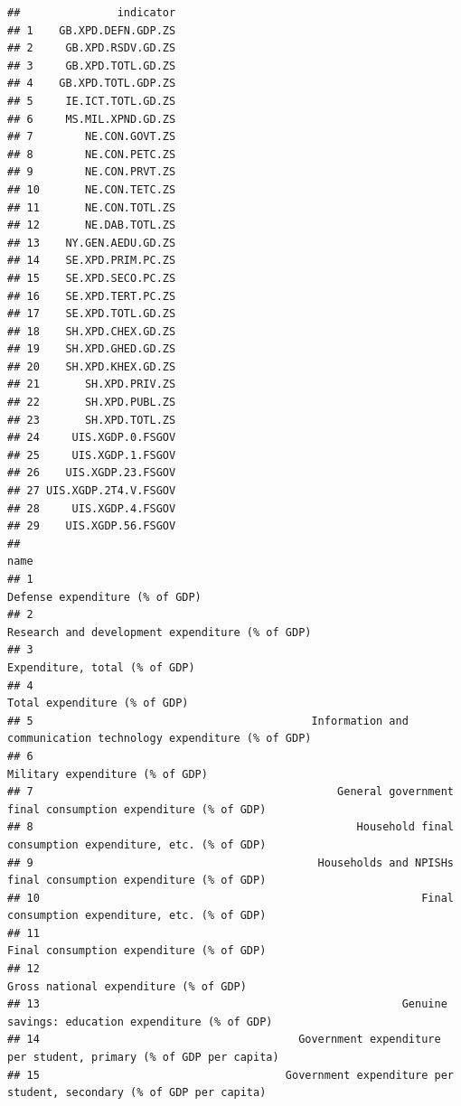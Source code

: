 \documentclass[
]{article}
\begin{document}
\begin{verbatim}
##               indicator
## 1    GB.XPD.DEFN.GDP.ZS
## 2     GB.XPD.RSDV.GD.ZS
## 3     GB.XPD.TOTL.GD.ZS
## 4    GB.XPD.TOTL.GDP.ZS
## 5     IE.ICT.TOTL.GD.ZS
## 6     MS.MIL.XPND.GD.ZS
## 7        NE.CON.GOVT.ZS
## 8        NE.CON.PETC.ZS
## 9        NE.CON.PRVT.ZS
## 10       NE.CON.TETC.ZS
## 11       NE.CON.TOTL.ZS
## 12       NE.DAB.TOTL.ZS
## 13    NY.GEN.AEDU.GD.ZS
## 14    SE.XPD.PRIM.PC.ZS
## 15    SE.XPD.SECO.PC.ZS
## 16    SE.XPD.TERT.PC.ZS
## 17    SE.XPD.TOTL.GD.ZS
## 18    SH.XPD.CHEX.GD.ZS
## 19    SH.XPD.GHED.GD.ZS
## 20    SH.XPD.KHEX.GD.ZS
## 21       SH.XPD.PRIV.ZS
## 22       SH.XPD.PUBL.ZS
## 23       SH.XPD.TOTL.ZS
## 24     UIS.XGDP.0.FSGOV
## 25     UIS.XGDP.1.FSGOV
## 26    UIS.XGDP.23.FSGOV
## 27 UIS.XGDP.2T4.V.FSGOV
## 28     UIS.XGDP.4.FSGOV
## 29    UIS.XGDP.56.FSGOV
##                                                                                                        name
## 1                                                                            Defense expenditure (% of GDP)
## 2                                                           Research and development expenditure (% of GDP)
## 3                                                                             Expenditure, total (% of GDP)
## 4                                                                              Total expenditure (% of GDP)
## 5                                           Information and communication technology expenditure (% of GDP)
## 6                                                                           Military expenditure (% of GDP)
## 7                                               General government final consumption expenditure (% of GDP)
## 8                                                  Household final consumption expenditure, etc. (% of GDP)
## 9                                            Households and NPISHs final consumption expenditure (% of GDP)
## 10                                                           Final consumption expenditure, etc. (% of GDP)
## 11                                                                 Final consumption expenditure (% of GDP)
## 12                                                                    Gross national expenditure (% of GDP)
## 13                                                        Genuine savings: education expenditure (% of GDP)
## 14                                        Government expenditure per student, primary (% of GDP per capita)
## 15                                      Government expenditure per student, secondary (% of GDP per capita)

\end{verbatim}
\end{document}
